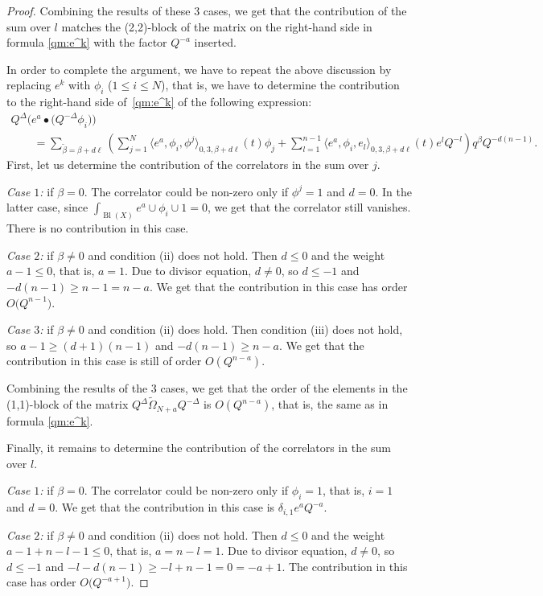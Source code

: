 \documentclass[pdftex]{sigma}
\numberwithin{equation}{section}
\begin{document}
\begin{proof}
Combining the results of these 3 cases, we get that the contribution
of the sum over $l$ matches the (2,2)-block of the matrix on the right-hand side
in formula \eqref{qm:e^k} with the factor $Q^{-a}$ inserted.

In order to complete the argument, we have to repeat the
above discussion by replacing $e^k$ with $\phi_i$ ($1\leq i\leq
N$), that is, we have to determine the contribution to the right-hand side of~\eqref{qm:e^k} of the following expression:
\begin{gather*}
Q^\Delta \big(e^a\bullet \big(Q^{-\Delta} \phi_i\big) \big)\\
\qquad=
\sum_{\widetilde{\beta}=\beta+d\ell}
\left(
\sum_{j=1}^N
\big\langle e^a, \phi_i, \phi^j\big\rangle_{0,3,\beta+ d\ell}(t)
\phi_j +
\sum_{l=1}^{n-1} \big\langle e^a, \phi_i, e_l\big\rangle_{0,3,\beta+d\ell} (t)
e^l Q^{-l}
\right) q^\beta Q^{-d(n-1)}.
\end{gather*}
First, let us determine the contribution of the correlators in the sum
over $j$.

{\em Case $1$:} if $\beta=0$. The correlator could be non-zero only if
$\phi^j=1$ and $d=0$. In the latter case, since $\int_{\operatorname{Bl}(X)}
e^a\cup \phi_i\cup 1 =0$, we get that the correlator still
vanishes. There is no contribution in this case.

{\em Case $2$:} if $\beta\neq 0$ and condition (ii) does not hold. Then
$d\leq 0$ and the weight $a-1\leq 0$, that is, $a=1$. Due to divisor
equation, $d\neq 0$, so $d\leq -1$ and $-d(n-1)\geq n-1=n-a$. We
get that the contribution in this case has order $O\big(Q^{n-1}\big)$.

{\em Case $3$:} if $\beta\neq 0$ and condition (ii) does hold. Then
condition (iii) does not hold, so
${a-1\geq (d+1)(n-1)}$ and $-d(n-1)\geq n-a$. We get that the
contribution in this case is still of order $O(Q^{n-a})$.

Combining the results of the 3 cases, we get that the order of the
elements in the (1,1)-block of the matrix
$Q^\Delta \widetilde{\Omega}_{N+a} Q^{-\Delta}$ is $O(Q^{n-a})$, that
is, the same as in formula \eqref{qm:e^k}.

Finally, it remains to determine the contribution of the correlators
in the sum over $l$.

{\em Case $1$:} if $\beta=0$. The correlator could be non-zero only if
$\phi_i=1$, that is, $i=1$ and $d=0$. We get that the contribution in
this case is $\delta_{i,1} e^a Q^{-a}$.

{\em Case $2$:} if $\beta\neq 0$ and condition (ii) does not hold. Then
$d\leq 0$ and the weight $a-1+n-l-1\leq 0$, that is, $a=n-l=1$. Due to divisor
equation, $d\neq 0$, so $d\leq -1$ and $-l-d(n-1)\geq
-l+n-1=0=-a+1$. The contribution in this case has order $O\big(Q^{-a+1}\big)$.


\end{proof}
\end{document}
